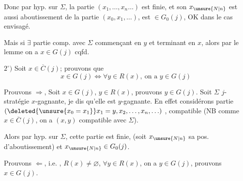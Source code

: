 
Donc par hyp. sur $\Sigma$, la partie $(x_1,\ldots,x_n\ldots)$ est finie,  et son  $x_{\unsure{N|n}}$  est aussi aboutissement de la partie $(x_0,x_1,\ldots)$, est $\in G_0(j)$,  OK dans le cas envisagé.

Mais si $\exists$ partie comp. avec $\Sigma$ commençant en $y$ et terminant en $x$, alors par le lemme on a  $x\in G(j)$ cqfd.

$2^\circ)$ Soit $x\in\overline C(j)$; prouvons que
\[
x\in G(j)\Longleftrightarrow\forall y\in R(x),\ \text{on a }y\in G(j)
\]


Prouvons $\Longrightarrow$, Soit $x\in G(j)$, $y\in R(x)$, prouvons $y\in G(j)$. Soit $\Sigma$ $j$-stratégie  $x$-gagnante, je dis qu'elle est $y$-gagnante. En effet considérons  partie $(\deleted{\unsure{x_0=x_1}}x_1=y,x_2,\ldots,x_n,\ldots)$ , compatible  (NB comme $x\in\overline C(j)$, on a $(x,y)$ compatible avec $\Sigma$).

Alors par hyp. sur $\Sigma$, cette partie est finie, (soit $x_{\unsure{N|n}}$ sa pos. d'aboutissement) et $x_{\unsure{N|n}}\in G_0(j)$. 

Prouvons $\Longleftarrow$, i.e. , $R(x)\ne\varnothing$, $\forall y\in R(x)$, on a $y\in G(j)$, prouvons $x\in G(j)$.

